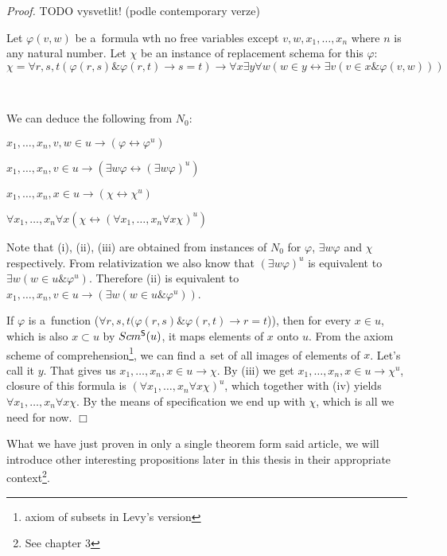 \documentclass[12pt,a4paper]{article}
\newenvironment{proof}
{\noindent \textit{Proof.}}
{\hspace*{\fill} $\Box$}
\renewcommand{\iff}{\leftrightarrow}
\newcommand{\then}{\rightarrow}
\newcommand{\bce}{\begin{compactenum}}
\newcommand{\ece}{\end{compactenum}}
\begin{document}
\begin{proof}
TODO vysvetlit! (podle contemporary verze)

Let $\varphi(v, w)$ be a~formula wth no free variables except $v, w, x_1, \ldots, x_n$ where $n$ is any natural number.
Let $\chi$ be an instance of replacement schema for this $\varphi$:
\begin{equation}
\chi = \forall r, s, t(\varphi(r, s) \& \varphi(r, t) \then s = t) \then \forall x \exists y \forall w (w \in y \iff \exists v (v \in x \& \varphi(v, w)))
\end{equation}

\

We can deduce the following from $N_0$: 
\bce[(i)]
\item $x_1, \ldots, x_n, v, w \in u \then (\varphi \iff \varphi^{u}) $
\item $x_1, \ldots, x_n, v \in u \then (\exists w \varphi \iff (\exists w \varphi)^{u})$
\item $x_1, \ldots, x_n, x \in u \then (\chi \iff \chi^{u})$
\item $\forall x_1, \ldots, x_n \forall x (\chi \iff (\forall x_1, \ldots, x_n \forall x \chi)^{u})$
\ece

Note that (i), (ii), (iii) are obtained from instances of $N_0$ for $\varphi$, $\exists w \varphi$ and $\chi$ respectively.  %
From relativization we also know that $(\exists w \varphi)^{u}$ is equivalent to $\exists w (w \in u \& \varphi^{u})$.
Therefore (ii) is equivalent to $x_1, \ldots, x_n, v \in u \then (\exists w (w \in u \& \varphi^{u}))$. 

If $\varphi$ is a~function ($ \forall r, s, t(\varphi(r, s) \& \varphi(r, t) \then r=t $)), then for every $x \in u$, which is also $x \subset u$ by $Scm^{\sf{S}}(u)$,
it maps elements of $x$ onto $u$. From the axiom scheme of comprehension\footnote{axiom of subsets in Levy's version}, we can find a~set of all images of elements of $x$. Let's call it $y$.
That gives us $x_1, \ldots, x_n, x \in u \then \chi$. By (iii) we get $x_1, \ldots, x_n, x \in u \then \chi^{u}$, closure of this formula is $(\forall x_1, \ldots, x_n \forall x \chi)^{u}$, 
which together with (iv) yields $\forall x_1, \ldots, x_n \forall x \chi$. By the means of specification we end up with $\chi$, which is all we need for now. 
\end{proof}


What we have just proven in only a single theorem form said article, we will introduce other interesting propositions later in this thesis in their appropriate context\footnote{See chapter 3}.
\end{document}

